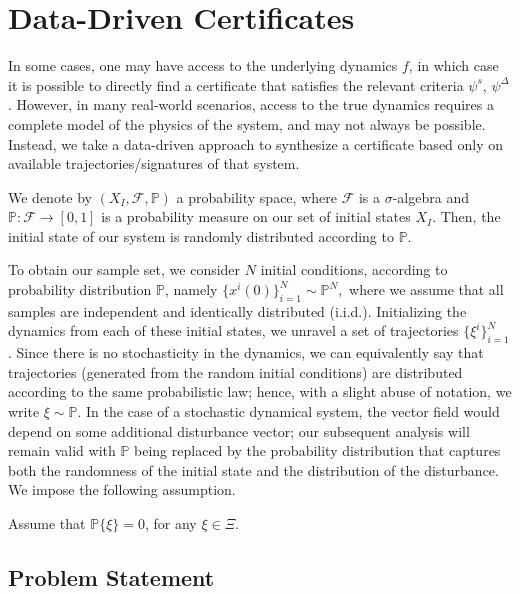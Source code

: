 \section{Data-Driven Certificates}
\label{sec:learn_certs}

In some cases, one may have access to the underlying dynamics $f$, in which case it is possible to directly find a certificate that satisfies the relevant criteria $\psi^s$, $\psi^{\Delta}$.
However, in many real-world scenarios, access to the true dynamics requires a complete model of the physics of the system, and may not always be possible.
Instead, we take a data-driven approach to synthesize a certificate based only on available trajectories/signatures of that system.

We denote by $(X_I,\mathcal{F},\mathbb{P})$ a probability space, where $\mathcal{F}$ is a $\sigma$-algebra and $\mathbb{P}\colon \mathcal{F}\rightarrow[0,1]$ is a probability measure on our set of initial states $X_I$.
Then, the initial state of our system is randomly distributed according to $\mathbb{P}$.

To obtain our sample set, we consider $N$ initial conditions, according to probability distribution $\mathbb{P}$, namely 
$
    \{x^i(0)\}_{i=1}^N \sim \mathbb{P}^N,$
where we assume that all samples are independent and identically distributed (i.i.d.).
Initializing the dynamics from each of these initial states, we unravel a set of trajectories $\{\xi^i\}_{i=1}^N$.  %
Since there is no stochasticity in the dynamics, we can equivalently say that trajectories (generated from the random initial conditions) are distributed according to the same probabilistic law; hence, with a slight abuse of notation, we write $\xi\sim \mathbb{P}$.
In the case of a stochastic dynamical system, the vector field would depend on some additional disturbance vector; our subsequent analysis will remain valid with $\mathbb{P}$ being replaced by the probability distribution that captures both the randomness of the initial state and the distribution of the disturbance. 
 We impose the following assumption.
\begin{assum}\label{ass:non-conc_mass}
	Assume that $\mathbb{P}\{\xi \}=0$, for any $\xi \in \Xi$.
\end{assum}

\subsection{Problem Statement}
\label{sec:learn_certs:data}


